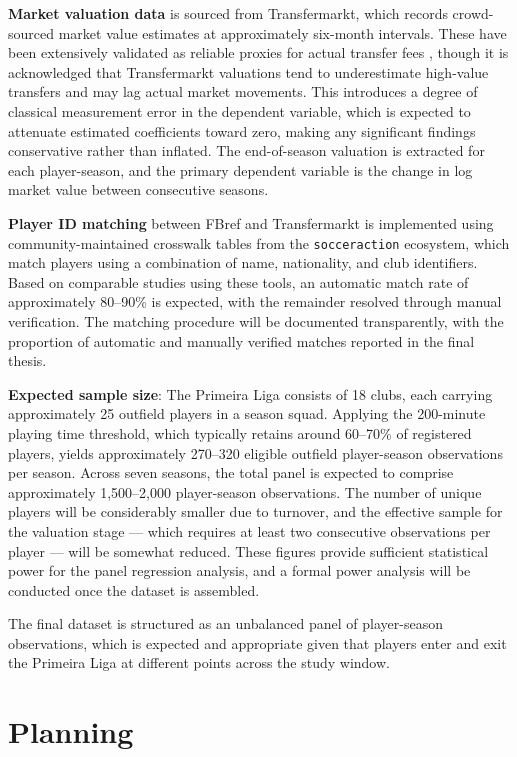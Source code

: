\documentclass[a4paper,11pt]{report}
\begin{document}
\textbf{Market valuation data} is sourced from Transfermarkt, which records crowd-sourced market value estimates at approximately six-month intervals. These have been extensively validated as reliable proxies for actual transfer fees \cite{muller2017beyond, franceschi2024determinants}, though it is acknowledged that Transfermarkt valuations tend to underestimate high-value transfers and may lag actual market movements. This introduces a degree of classical measurement error in the dependent variable, which is expected to attenuate estimated coefficients toward zero, making any significant findings conservative rather than inflated. The end-of-season valuation is extracted for each player-season, and the primary dependent variable is the change in log market value between consecutive seasons.

\textbf{Player ID matching} between FBref and Transfermarkt is implemented using community-maintained crosswalk tables from the \texttt{socceraction} ecosystem, which match players using a combination of name, nationality, and club identifiers. Based on comparable studies using these tools, an automatic match rate of approximately 80--90\% is expected, with the remainder resolved through manual verification. The matching procedure will be documented transparently, with the proportion of automatic and manually verified matches reported in the final thesis.

\textbf{Expected sample size}: The Primeira Liga consists of 18 clubs, each carrying approximately 25 outfield players in a season squad. Applying the 200-minute playing time threshold, which typically retains around 60--70\% of registered players, yields approximately 270--320 eligible outfield player-season observations per season. Across seven seasons, the total panel is expected to comprise approximately 1,500--2,000 player-season observations. The number of unique players will be considerably smaller due to turnover, and the effective sample for the valuation stage — which requires at least two consecutive observations per player — will be somewhat reduced. These figures provide sufficient statistical power for the panel regression analysis, and a formal power analysis will be conducted once the dataset is assembled.

The final dataset is structured as an unbalanced panel of player-season observations, which is expected and appropriate given that players enter and exit the Primeira Liga at different points across the study window.


\chapter{Planning}
\end{document}
